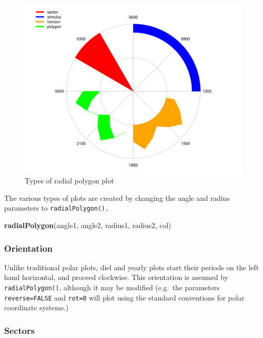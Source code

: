 \documentclass[
]{book}
\newenvironment{Shaded}{\begin{snugshade}}{\end{snugshade}}
\newcommand{\FunctionTok}[1]{\textcolor[rgb]{0.13,0.29,0.53}{\textbf{#1}}}
\newcommand{\NormalTok}[1]{#1}
\begin{document}
\begin{figure}

{\centering \includegraphics[width=0.9\linewidth]{_main_files/figure-latex/radialPolygon-types-1} 

}

\caption{Types of radial polygon plot}\label{fig:radialPolygon-types}
\end{figure}

The various types of plots are created by changing the angle and radius parameters to \texttt{radialPolygon().}

\begin{Shaded}
\begin{Highlighting}[]
\FunctionTok{radialPolygon}\NormalTok{(angle1, angle2, radius1, radius2, col)}
\end{Highlighting}
\end{Shaded}

\hypertarget{orientation}{%
\subsubsection{Orientation}\label{orientation}}

Unlike traditional polar plots, diel and yearly plots start their periods on the left hand horizontal, and proceed clockwise. This orientation is assumed by \texttt{radialPolygon()}, although it may be modified (e.g.~the parameters \texttt{reverse=FALSE} and \texttt{rot=0} will plot using the standard conventions for polar coordinate systems.)

\hypertarget{sectors}{%
\subsubsection{Sectors}\label{sectors}}
\end{document}
